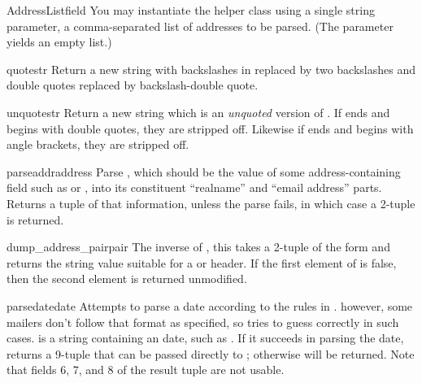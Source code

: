 \begin{classdesc}{AddressList}{field}
You may instantiate the  helper class using a single
string parameter, a comma-separated list of  addresses to be
parsed.  (The parameter  yields an empty list.)
\end{classdesc}

\begin{funcdesc}{quote}{str}
Return a new string with backslashes in  replaced by two
backslashes and double quotes replaced by backslash-double quote.
\end{funcdesc}

\begin{funcdesc}{unquote}{str}
Return a new string which is an \emph{unquoted} version of .
If  ends and begins with double quotes, they are stripped
off.  Likewise if  ends and begins with angle brackets, they
are stripped off.
\end{funcdesc}

\begin{funcdesc}{parseaddr}{address}
Parse , which should be the value of some
address-containing field such as  or ,
into its constituent ``realname'' and ``email address'' parts.
Returns a tuple of that information, unless the parse fails, in which
case a 2-tuple  is returned.
\end{funcdesc}

\begin{funcdesc}{dump_address_pair}{pair}
The inverse of , this takes a 2-tuple of the form
 and returns the string
value suitable for a  or  header.  If
the first element of  is false, then the second element is
returned unmodified.
\end{funcdesc}

\begin{funcdesc}{parsedate}{date}
Attempts to parse a date according to the rules in .
however, some mailers don't follow that format as specified, so
 tries to guess correctly in such cases. 
 is a string containing an  date, such as 
.  If it succeeds in parsing
the date,  returns a 9-tuple that can be passed
directly to ; otherwise  will be
returned.  Note that fields 6, 7, and 8 of the result tuple are not
usable.
\end{funcdesc}

